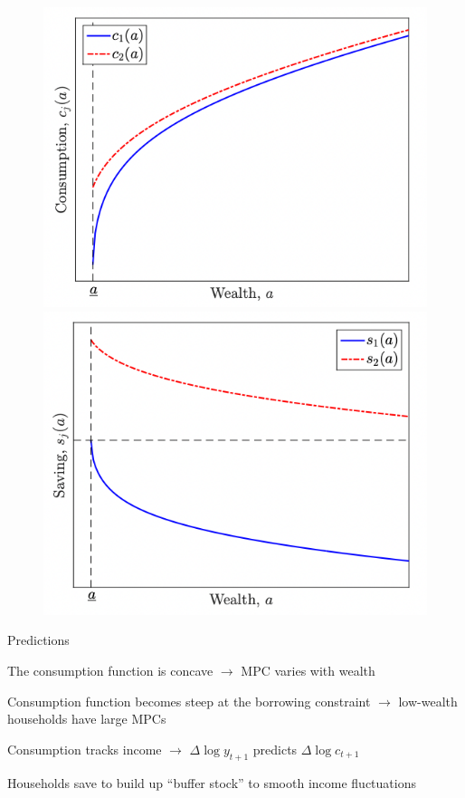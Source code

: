 \documentclass[11pt, aspectratio=169]{beamer}
\newenvironment{witemize}{\itemize\addtolength{\itemsep}{10pt}}{\enditemize}
\begin{document}
\begin{frame}{}
	\begin{figure}
		\includegraphics[scale=0.35]{./figures/HACT_consumption}
		\qquad
		\includegraphics[scale=0.35]{./figures/HACT_savings}
	\end{figure}
\end{frame}


\begin{frame}{Predictions}

\begin{witemize}
\item The consumption function is concave $\to$ MPC varies with wealth

\item Consumption function becomes steep at the borrowing constraint $\to$ low-wealth households have large MPCs

\item Consumption tracks income $\to$ $\Delta \log y_{t+1}$ predicts $\Delta \log c_{t+1}$

\item Households save to build up ``buffer stock'' to smooth income fluctuations 
\end{witemize}
\end{frame}
\end{document}
